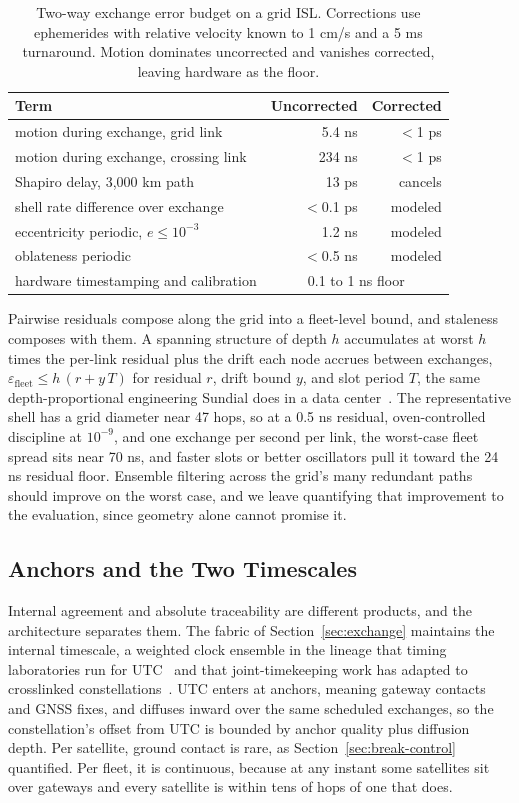 \documentclass[twocolumn,10pt]{article}
\begin{document}
\begin{table}[t]
\centering
\small
\begin{tabular}{@{}lrr@{}}
\toprule
\textbf{Term} & \textbf{Uncorrected} & \textbf{Corrected} \\
\midrule
motion during exchange, grid link & 5.4 ns & $<$1 ps \\
motion during exchange, crossing link & 234 ns & $<$1 ps \\
Shapiro delay, 3{,}000 km path & 13 ps & cancels \\
shell rate difference over exchange & $<$0.1 ps & modeled \\
eccentricity periodic, $e\le10^{-3}$ & 1.2 ns & modeled \\
oblateness periodic & $<$0.5 ns & modeled \\
hardware timestamping and calibration & \multicolumn{2}{c}{0.1 to 1 ns floor} \\
\bottomrule
\end{tabular}
\caption{Two-way exchange error budget on a grid ISL. Corrections use ephemerides with relative velocity known to 1 cm/s and a 5 ms turnaround. Motion dominates uncorrected and vanishes corrected, leaving hardware as the floor.}
\label{tab:budget}
\end{table}

Pairwise residuals compose along the grid into a fleet-level bound, and staleness composes with them. A spanning structure of depth $h$ accumulates at worst $h$ times the per-link residual plus the drift each node accrues between exchanges, $\varepsilon_{\mathrm{fleet}} \le h\,(r + y\,T)$ for residual $r$, drift bound $y$, and slot period $T$, the same depth-proportional engineering Sundial does in a data center~\cite{li2020}. The representative shell has a grid diameter near 47 hops, so at a 0.5 ns residual, oven-controlled discipline at $10^{-9}$, and one exchange per second per link, the worst-case fleet spread sits near 70 ns, and faster slots or better oscillators pull it toward the 24 ns residual floor. Ensemble filtering across the grid's many redundant paths should improve on the worst case, and we leave quantifying that improvement to the evaluation, since geometry alone cannot promise it.

\subsection{Anchors and the Two Timescales}\label{sec:anchors}
Internal agreement and absolute traceability are different products, and the architecture separates them. The fabric of Section~\ref{sec:exchange} maintains the internal timescale, a weighted clock ensemble in the lineage that timing laboratories run for UTC~\cite{lombardi} and that joint-timekeeping work has adapted to crosslinked constellations~\cite{sensors2020}. UTC enters at anchors, meaning gateway contacts and GNSS fixes, and diffuses inward over the same scheduled exchanges, so the constellation's offset from UTC is bounded by anchor quality plus diffusion depth. Per satellite, ground contact is rare, as Section~\ref{sec:break-control} quantified. Per fleet, it is continuous, because at any instant some satellites sit over gateways and every satellite is within tens of hops of one that does.
\end{document}

